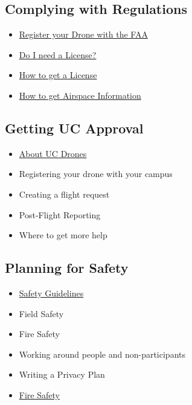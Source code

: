 \documentclass[
]{book}
\providecommand{\tightlist}{%
  \setlength{\itemsep}{0pt}\setlength{\parskip}{0pt}}
\begin{document}
\hypertarget{complying-with-regulations}{%
\subsection*{Complying with Regulations}\label{complying-with-regulations}}

\begin{itemize}
\tightlist
\item
  \protect\hyperlink{ch-register}{Register your Drone with the FAA}
\item
  \protect\hyperlink{ch-license}{Do I need a License?}
\item
  \protect\hyperlink{ch-get-license}{How to get a License}
\item
  \protect\hyperlink{ch-airspace-info}{How to get Airspace Information}
\end{itemize}

\hypertarget{getting-uc-approval}{%
\subsection*{Getting UC Approval}\label{getting-uc-approval}}

\begin{itemize}
\tightlist
\item
  \protect\hyperlink{ch-about-UCdrones}{About UC Drones}
\item
  Registering your drone with your campus
\item
  Creating a flight request
\item
  Post-Flight Reporting
\item
  Where to get more help
\end{itemize}

\hypertarget{planning-for-safety}{%
\subsection*{Planning for Safety}\label{planning-for-safety}}

\begin{itemize}
\tightlist
\item
  \protect\hyperlink{ch-safety-guidelines}{Safety Guidelines}
\item
  Field Safety
\item
  Fire Safety
\item
  Working around people and non-participants
\item
  Writing a Privacy Plan
\item
  \protect\hyperlink{ch-fire-safety}{Fire Safety}
\end{itemize}
\end{document}

